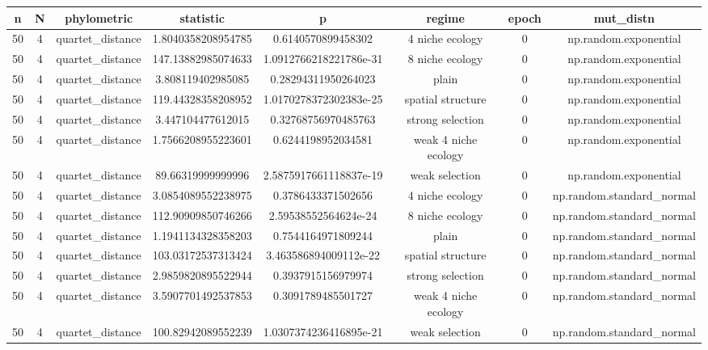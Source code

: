 \begin{longtable}{||c c c c c c c c||}\small
    \centering
   n & N & phylometric & statistic & p & regime & epoch & mut\_distn \\  [0.5ex]
     \hline
        50 & 4 & quartet\_distance & 1.8040358208954785 & 0.6140570899458302 & 4 niche ecology & 0 & np.random.exponential \\ 
        50 & 4 & quartet\_distance & 147.13882985074633 & 1.0912766218221786e-31 & 8 niche ecology & 0 & np.random.exponential \\ 
        50 & 4 & quartet\_distance & 3.808119402985085 & 0.28294311950264023 & plain & 0 & np.random.exponential \\ 
        50 & 4 & quartet\_distance & 119.44328358208952 & 1.0170278372302383e-25 & spatial structure & 0 & np.random.exponential \\ 
        50 & 4 & quartet\_distance & 3.447104477612015 & 0.32768756970485763 & strong selection & 0 & np.random.exponential \\ 
        50 & 4 & quartet\_distance & 1.7566208955223601 & 0.6244198952034581 & weak 4 niche ecology & 0 & np.random.exponential \\ 
        50 & 4 & quartet\_distance & 89.66319999999996 & 2.5875917661118837e-19 & weak selection & 0 & np.random.exponential \\ 
        50 & 4 & quartet\_distance & 3.0854089552238975 & 0.3786433371502656 & 4 niche ecology & 0 & np.random.standard\_normal \\ 
        50 & 4 & quartet\_distance & 112.90909850746266 & 2.59538552564624e-24 & 8 niche ecology & 0 & np.random.standard\_normal \\ 
        50 & 4 & quartet\_distance & 1.1941134328358203 & 0.7544164971809244 & plain & 0 & np.random.standard\_normal \\ 
        50 & 4 & quartet\_distance & 103.03172537313424 & 3.463586894009112e-22 & spatial structure & 0 & np.random.standard\_normal \\ 
        50 & 4 & quartet\_distance & 2.9859820895522944 & 0.3937915156979974 & strong selection & 0 & np.random.standard\_normal \\ 
        50 & 4 & quartet\_distance & 3.5907701492537853 & 0.3091789485501727 & weak 4 niche ecology & 0 & np.random.standard\_normal \\ 
        50 & 4 & quartet\_distance & 100.82942089552239 & 1.0307374236416895e-21 & weak selection & 0 & np.random.standard\_normal \\ 

\end{longtable}
